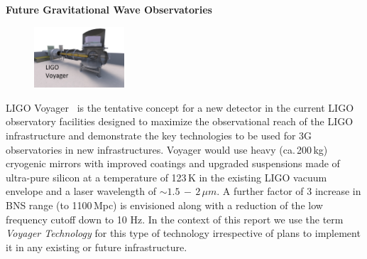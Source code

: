 \begin{DetBox}{\bf Future Gravitational Wave Observatories}
\begin{tcolorbox}[standard jigsaw,colframe=azure!70!black,colback=azure!20!white,opacityback=0.6,coltext=black, size=small, title= LIGO Voyager]
\begin{figure}
\vspace{-10pt}
\includegraphics*[width=0.3\textwidth]{Figures/Voyager_Thumb.jpg}
\label{fig:Voyager_Thumb}
\vspace{-20pt}
\end{figure}

LIGO Voyager~\cite{Voyager:Inst,VoyagerDCC2018} is the tentative concept for a new detector in the current LIGO observatory facilities designed to maximize the observational reach of the LIGO infrastructure and demonstrate the key technologies to be used for 3G observatories in new infrastructures.
Voyager would use heavy (ca.\,200\,kg) cryogenic mirrors with improved coatings and upgraded suspensions made of ultra-pure silicon at a temperature of 123\,K in the existing LIGO vacuum envelope and a laser wavelength of $\sim1.5\,-\,2\,\mu m$. 
A further factor of 3 increase in BNS range (to 1100\,Mpc) is envisioned along with a reduction of the low frequency cutoff down to 10 Hz. In the context of this report we use the term \emph{Voyager Technology} for this type of technology irrespective of plans to implement it in any existing or future infrastructure.
\end{tcolorbox}

\end{DetBox}



